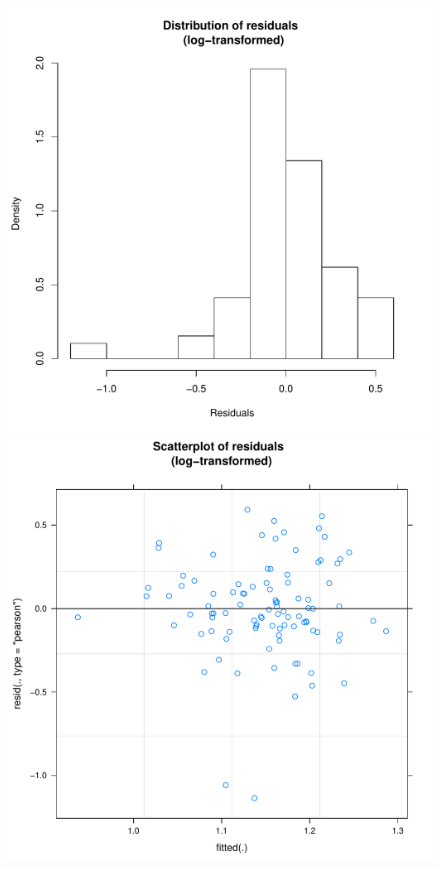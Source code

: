 \begin{CJK}{UTF8}{gbsn}
      \begin{figure}[htbp]
        \includegraphics[scale =.4]{images/MLM23bLogHist.pdf}
        \includegraphics[scale =.4]{images/MLM23bLogScatter.pdf}

\end{figure}
\end{CJK}
